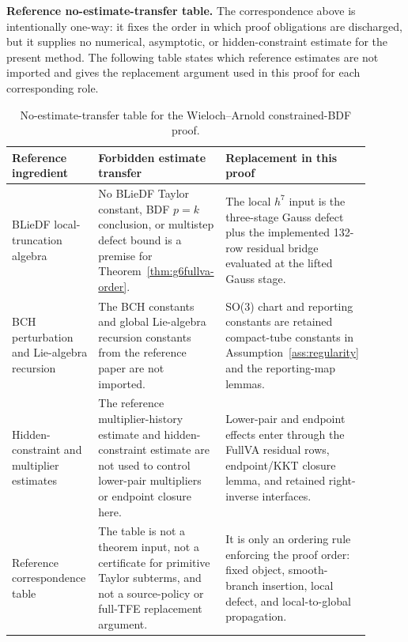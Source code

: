 \documentclass[preprint,12pt]{elsarticle}
\newcommand{\tfe}{TFE}
\begin{document}
\noindent\textbf{Reference no-estimate-transfer table.}
The correspondence above is intentionally one-way: it fixes the order in
which proof obligations are discharged, but it supplies no numerical,
asymptotic, or hidden-constraint estimate for the present method.  The
following table states which reference estimates are not imported and gives
the replacement argument used in this proof for each corresponding role.
\begin{table}[htbp]
\centering
\caption{No-estimate-transfer table for the Wieloch--Arnold constrained-BDF proof.}
\label{tab:reference-no-estimate-transfer-ledger}
\scriptsize
\setlength{\tabcolsep}{2pt}
\renewcommand{\arraystretch}{0.9}
\begin{tabular}{P{0.24\linewidth}P{0.31\linewidth}P{0.35\linewidth}}
\toprule
Reference ingredient & Forbidden estimate transfer & Replacement in this proof \\
\midrule
BLieDF local-truncation algebra &
No BLieDF Taylor constant, BDF \(p=k\) conclusion, or multistep defect bound
is a premise for Theorem~\ref{thm:g6fullva-order}. &
The local \(h^7\) input is the three-stage Gauss defect plus the implemented
132-row residual bridge evaluated at the lifted Gauss stage. \\
BCH perturbation and Lie-algebra recursion &
The BCH constants and global Lie-algebra recursion constants from the
reference paper are not imported. &
SO(3) chart and reporting constants are retained compact-tube constants in
Assumption~\ref{ass:regularity} and the reporting-map lemmas. \\
Hidden-constraint and multiplier estimates &
The reference multiplier-history estimate and hidden-constraint estimate are
not used to control lower-pair multipliers or endpoint closure here. &
Lower-pair and endpoint effects enter through the FullVA residual rows,
endpoint/KKT closure lemma, and retained right-inverse interfaces. \\
Reference correspondence table &
The table is not a theorem input, not a certificate for primitive Taylor
subterms, and not a source-policy or full-\tfe{} replacement argument. &
It is only an ordering rule enforcing the proof order:
fixed object, smooth-branch insertion, local defect, and local-to-global
propagation. \\
\bottomrule
\end{tabular}
\end{table}
\end{document}
